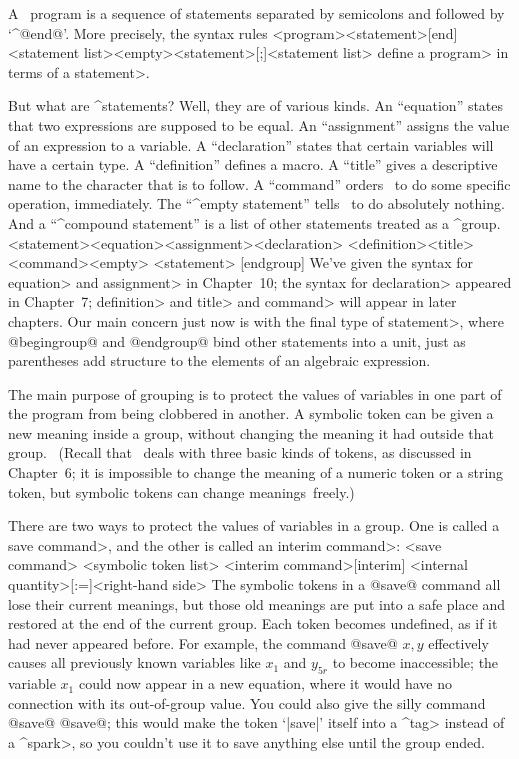 {{{{A \MF\ program is a sequence of statements separated by semicolons and
followed by `^@end@'. More precisely, the syntax rules
\beginsyntax
<program><statement>[end]
<statement list>\is<empty>\alt<statement>[;]<statement list>
\endsyntax
define a \<program> in terms of a \<statement>.

But what are ^{statements}? Well, they are of various kinds. An ``equation''
states that two expressions are supposed to be equal. An ``assignment''
assigns the value of an expression to a variable. A ``declaration''
states that certain variables will have a certain type.
A ``definition'' defines a macro.  A ``title'' gives a descriptive name to
the character that is to follow.  A ``command'' orders \MF\ to do some
specific operation, immediately.  The ``^{empty statement}'' tells \MF\ to
do absolutely nothing.  And a ``^{compound statement}'' is a list of other
statements treated as a ^{group}.
\beginsyntax
<statement>\is<equation>\alt<assignment>\alt<declaration>
 \alt<definition>\alt<title>\alt<command>\alt<empty>
  <statement> [endgroup]
\endsyntax
We've given the syntax for \<equation> and \<assignment> in Chapter~10;
the syntax for \<declaration> appeared in Chapter~7; \<definition> and
\<title> and \<command> will appear in later chapters. Our main concern
just now is with the final type of \<statement>, where @begingroup@
and @endgroup@ bind other statements into a unit, just as parentheses
add structure to the elements of an algebraic expression.

The main purpose of grouping is to protect the values of variables in
one part of the program from being clobbered in another. A symbolic token
can be given a new meaning inside a group, without changing the
meaning it had outside that group. \ (Recall that \MF\ deals with
three basic kinds of tokens, as discussed in Chapter~6; it is impossible
to change the meaning of a numeric token or a string token, but
symbolic tokens can change meanings~freely.)

There are two ways to protect the values of variables in a group. One
is called a \<save command>, and the other is called an \<interim command>:
\beginsyntax
<save command>
<symbolic token list>
<interim command>\is\kern-1.5pt[interim]%
 <internal quantity>[:=]<right-hand side>\kern-1pt
\endsyntax
The symbolic tokens in a @save@ command all lose their current meanings, but
those old meanings are put into a safe place and restored at the end of
the current group. Each token becomes undefined, as if it had never
appeared before. For example, the command
\begindisplay
@save@ $x,y$
\enddisplay
effectively causes all previously known variables like $x_1$ and $y_{5r}$ to
become inaccessible; the variable $x_1$ could now appear in a new equation,
where it would have no connection with its out-of-group value. You could
also give the silly command
\begindisplay
@save@ @save@;
\enddisplay
this would make the token `|save|' itself into a ^\<tag> instead of a
^\<spark>, so you couldn't use it to save anything else until the group ended.

}}}}
